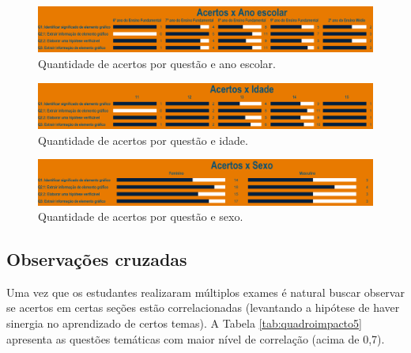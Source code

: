 \documentclass[
]{book}
\begin{document}
\begin{figure}

{\centering \includegraphics[width=0.75\linewidth,height=0.75\textheight]{images/Impactos/46} 

}

\caption{Quantidade de acertos por questão e ano escolar.}\label{fig:impacto46}
\end{figure}

\begin{figure}

{\centering \includegraphics[width=0.75\linewidth,height=0.75\textheight]{images/Impactos/47} 

}

\caption{Quantidade de acertos por questão e idade.}\label{fig:impacto47}
\end{figure}

\begin{figure}

{\centering \includegraphics[width=0.75\linewidth,height=0.75\textheight]{images/Impactos/48} 

}

\caption{Quantidade de acertos por questão e sexo.}\label{fig:impacto48}
\end{figure}

\hypertarget{observauxe7uxf5es-cruzadas}{%
\subsection{Observações cruzadas}\label{observauxe7uxf5es-cruzadas}}

Uma vez que os estudantes realizaram múltiplos exames é natural buscar observar se acertos em certas seções estão correlacionadas (levantando a hipótese de haver sinergia no aprendizado de certos temas). A Tabela \ref{tab:quadroimpacto5} apresenta as questões temáticas com maior nível de correlação (acima de 0,7).
\end{document}
